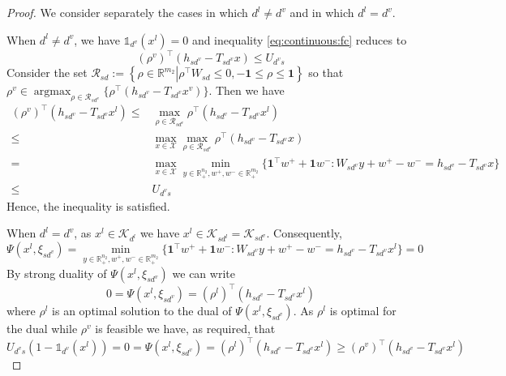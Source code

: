 \documentclass[10pt,a4paper]{amsart}
\DeclareMathOperator*{\argmax}{argmax}
\def\Ind{\ensuremath{\mathbb{1}}}
\def\R{\ensuremath{\mathbb{R}}}
\newcommand{\mtc}[1] {\mathcal{#1}}
\begin{document}
\begin{proof}
We consider separately the cases in which $d^l\neq d^v$ and in which $d^l=d^v$.

When $d^l\neq d^v$, we have $\Ind_{d^v}(x^l)=0$ and inequality \eqref{eq:continuous:fc} reduces to 
$$(\rho^v)^\top(h_{sd^v}-T_{sd^v}x)\leq U_{d^vs}$$
Consider the set $\mtc{R}_{sd}:=\left\{\rho\in\R^{m_2}\left\vert \rho^\top W_{sd}\leq 0,-\mathbf{1}\leq\rho\leq \mathbf{1}\right.\right\}$
so that $\rho^v\in \argmax_{\rho\in\mtc{R}_{sd^v}} \{\rho^\top(h_{sd^v}-T_{sd^v}x^v)\}$. 
Then we have
\begin{align*}
  (\rho^v)^\top(h_{sd^v}-T_{sd^v}x^l)\leq& \max_{\rho\in\mtc{R}_{sd^v}}\rho^\top(h_{sd^v}-T_{sd^v}x^l)\\
  \leq &\max_{x\in\mtc{X}}\max_{\rho\in\mtc{R}_{sd^v}}\rho^\top(h_{sd^v}-T_{sd^v}x)\\
  =&\max_{x\in\mtc{X}}\min_{y\in\R^{n_2}_+,w^+,w^-\in\R^{m_2}_+}\{\mathbf{1}^\top w^++\mathbf{1}w^-:W_{sd^v}y+w^+-w^-=h_{sd^v}-T_{sd^v}x\}\\
  \leq & U_{d^vs}
\end{align*}
Hence, the inequality is satisfied.

When $d^l=d^v$, as $x^l\in\mtc{K}_{d^l}$ we have $x^l\in\mtc{K}_{sd^l}=\mtc{K}_{sd^v}$.
Consequently, 
$$\Psi(x^l,\xi_{sd^v})=\min_{y\in\R^{n_2}_+,w^+,w^-\in\R^{m_2}_+}\{\mathbf{1}^\top w^++\mathbf{1}w^-:W_{sd^v}y+w^+-w^-=h_{sd^v}-T_{sd^v}x^l\}=0$$
By strong duality of $\Psi(x^l,\xi_{sd^v})$ we can write
$$0=\Psi(x^l,\xi_{sd^v})=(\rho^l)^\top(h_{sd^v}-T_{sd^v}x^l)$$
where $\rho^l$ is an optimal solution to the dual of $\Psi(x^l,\xi_{sd^v})$.
As $\rho^l$ is optimal for the dual while $\rho^v$ is feasible we have, as required, that
$$U_{d^vs}(1-\Ind_{d^v}(x^l))=0=\Psi(x^l,\xi_{sd^v})=(\rho^l)^\top(h_{sd^v}-T_{sd^v}x^l)\geq (\rho^v)^\top(h_{sd^v}-T_{sd^v}x^l)$$

\end{proof}
\end{document}
